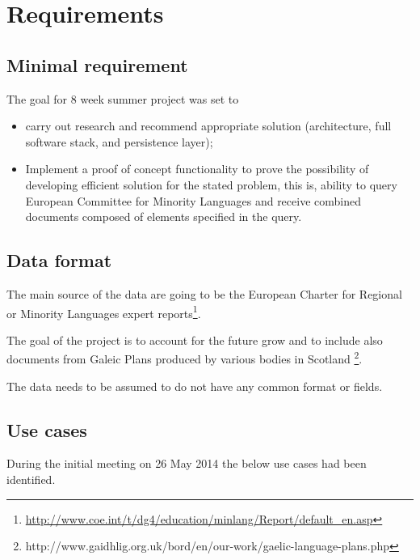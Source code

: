 \documentclass[11pt, a4paper]{report}
\begin{document}


\chapter{Requirements}

\section{Minimal requirement}
The goal for 8 week summer project was set to
\begin{itemize}
  \item carry out research and recommend appropriate solution (architecture, full software stack, and persistence layer);
  \item Implement a proof of concept functionality to prove the possibility of developing efficient solution for the stated problem, this is, ability to query European Committee for Minority Languages and receive combined documents composed of elements specified in the query.
\end{itemize}

\section{Data format}
The main source of the data are going to be the European Charter for Regional or Minority Languages expert reports\footnote{\url{http://www.coe.int/t/dg4/education/minlang/Report/default_en.asp}}.

The goal of the project is to account for the future grow and to include also documents from Galeic Plans produced by various bodies in Scotland \footnote{http://www.gaidhlig.org.uk/bord/en/our-work/gaelic-language-plans.php}.

The data needs to be assumed to do not have any common format or fields.

\section{Use cases}
During the initial meeting on 26 May 2014 the below use cases had been identified.








\end{document}
